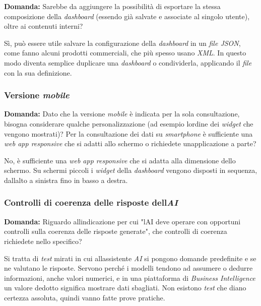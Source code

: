 \documentclass[12pt,a4paper]{article}
\begin{document}
\textbf{Domanda:} Sarebbe da aggiungere la possibilità di esportare la stessa composizione della \emph{dashboard} (essendo già salvate e associate al singolo utente), oltre ai contenuti interni?

Sì, può essere utile salvare la configurazione della \emph{dashboard} in un \emph{file JSON}, come fanno alcuni prodotti commerciali, che più spesso usano \emph{XML}. In questo modo diventa semplice duplicare una \emph{dashboard} o condividerla, applicando il \emph{file} con la sua definizione.

\hypertarget{versione-mobile}{%
\subsubsection{\texorpdfstring{Versione \emph{mobile}}{Versione mobile}}}

\textbf{Domanda:} Dato che la versione \emph{mobile} è indicata per la sola consultazione, bisogna considerare qualche personalizzazione (ad esempio l\textquotesingle ordine dei \emph{widget} che vengono mostrati)? Per la consultazione dei dati su \emph{smartphone} è sufficiente una \emph{web app responsive} che si adatti allo schermo o richiedete un\textquotesingle applicazione a parte?

No, è sufficiente una \emph{web app responsive} che si adatta alla dimensione dello schermo. Su schermi piccoli i \emph{widget} della \emph{dashboard} vengono disposti in sequenza, dall\textquotesingle alto a sinistra fino in basso a destra.

\hypertarget{controlli-di-coerenza-delle-risposte-dellai}{%
\subsubsection{\texorpdfstring{Controlli di coerenza delle risposte dell\textquotesingle{}\emph{AI}}{Controlli di coerenza delle risposte dell\textquotesingle AI}}}

\textbf{Domanda:} Riguardo all\textquotesingle indicazione per cui "l\textquotesingle AI deve operare con opportuni controlli sulla coerenza delle risposte generate", che controlli di coerenza richiedete nello specifico?

Si tratta di \emph{test} mirati in cui all\textquotesingle assistente \emph{AI} si pongono domande predefinite e se ne valutano le risposte. Servono perché i modelli tendono ad assumere o dedurre informazioni, anche valori numerici, e in una piattaforma di \emph{Business Intelligence} un valore dedotto significa mostrare dati sbagliati. Non esistono \emph{test} che diano certezza assoluta, quindi vanno fatte prove pratiche.
\end{document}

